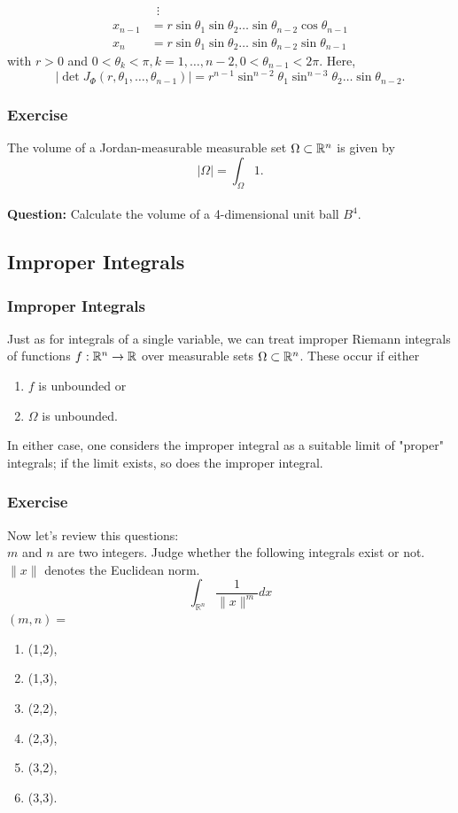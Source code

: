 \documentclass[12pt, t]{beamer}
\newcommand{\nullspace}{~\\[15pt]}
\newcommand{\Question}{\textbf{Question: }}
\begin{document}
\begin{frame}[allowframebreaks]
\begin{itemize}
\begin{align*}
                        & \,\,\,\vdots                                                     \\
                x_{n-1} & =r\sin\theta_1\sin\theta_2\ldots\sin\theta_{n-2}
                \cos\theta_{n-1}                                                           \\
                x_n     & =r\sin\theta_1\sin\theta_2\ldots\sin\theta_{n-2}\sin\theta_{n-1}
            \end{align*}
            with $r>0$ and $0<\theta_k<\pi,k=1,\ldots,n-2,0<\theta_{n-1}<2\pi$. Here,
            \[|\det J_\Phi(r,\theta_1,\ldots,\theta_{n-1})|=r^{n-1}\sin^{n-2}\theta_1
                \sin^{n-3}\theta_2\ldots\sin\theta_{n-2}.\]
    \end{itemize}
\end{frame}

\begin{frame}
    \frametitle{Exercise}
    The volume of a Jordan-measurable measurable set $\Omega\subset\mathbb{R}^n$ is given by
    \[|\Omega|=\int_\Omega1.\]
    \nullspace
    \Question Calculate the volume of a 4-dimensional unit ball $B^4$.

\end{frame}

\subsection{Improper Integrals}
\begin{frame}
    \frametitle{Improper Integrals}
    Just as for integrals of a single variable, we can treat improper Riemann
    integrals of functions $f:\mathbb{R}^n\to\mathbb{R}$ over measurable sets $\Omega\subset\mathbb{R}^n$. These occur if either
    \begin{enumerate}[1.]
        \item $f$ is unbounded or
        \item $\Omega$ is unbounded.
    \end{enumerate}
    In either case, one considers the improper integral as a suitable limit of
    "proper" integrals; if the limit exists, so does the improper integral.\\[5pt]
\end{frame}

\begin{frame}
    \frametitle{Exercise}
    Now let's review this questions:\\
    $m$ and $n$ are two integers. Judge whether the following integrals exist or not. $\|x\|$ denotes the Euclidean norm.
    \[
        \int_{\mathbb{R}^{n}} \frac{1}{\|x\|^{m}} d x
    \]
    $(m, n)=$
    \begin{enumerate}
        \item (1,2),
        \item (1,3),
        \item (2,2),
        \item (2,3),
        \item (3,2),
        \item (3,3).
    \end{enumerate}
\end{frame}
\end{document}
